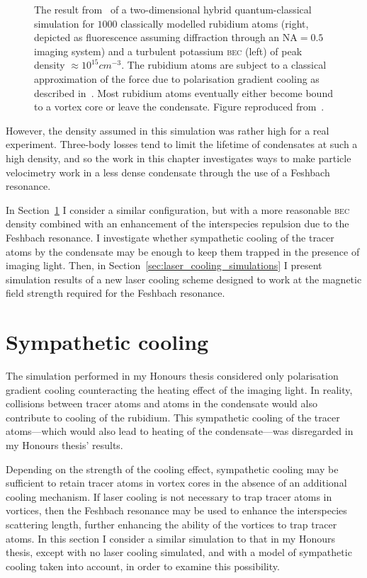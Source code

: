 \begin{figure}
\caption{The result from~\cite{billington_particle_2010} of a two-dimensional hybrid quantum-classical simulation for $1000$ classically modelled rubidium atoms (right, depicted as fluorescence assuming diffraction through an $\mathrm{NA}=0.5$ imaging system) and a turbulent potassium \textsc{bec} (left) of peak density $\approx 10^{15}\unit{cm}^{-3}$. The rubidium atoms are subject to a classical approximation of the force due to polarisation gradient cooling as described in~\cite{billington_particle_2010}. Most rubidium atoms eventually either become bound to a vortex core or leave the condensate. Figure reproduced from~\cite{billington_particle_2010}.}%
\label{fig:hybrid}%
\end{figure}

However, the density assumed in this simulation was rather high for a real experiment. Three-body losses tend to limit the lifetime of condensates at such a high density, and so the work in this chapter investigates ways to make particle velocimetry work in a less dense condensate through the use of a Feshbach resonance.

In Section~\ref{sec:sympathetic} I consider a similar configuration, but with a more reasonable \textsc{bec} density combined with an enhancement of the interspecies repulsion due to the Feshbach resonance. I investigate whether sympathetic cooling of the tracer atoms by the condensate may be enough to keep them trapped in the presence of imaging light. Then, in Section~\ref{sec:laser_cooling_simulations} I present simulation results of a new laser cooling scheme designed to work at the magnetic field strength required for the Feshbach resonance.

\section{Sympathetic cooling}\label{sec:sympathetic}

The simulation performed in my Honours thesis considered only polarisation gradient cooling counteracting the heating effect of the imaging light. In reality, collisions between tracer atoms and atoms in the condensate would also contribute to cooling of the rubidium. This sympathetic cooling of the tracer atoms---which would also lead to heating of the condensate---was disregarded in my Honours thesis' results. 

Depending on the strength of the cooling effect, sympathetic cooling may be sufficient to retain tracer atoms in vortex cores in the absence of an additional cooling mechanism. If laser cooling is not necessary to trap tracer atoms in vortices, then the Feshbach resonance may be used to enhance the interspecies scattering length, further enhancing the ability of the vortices to trap tracer atoms. In this section I consider a similar simulation to that in my Honours thesis, except with no laser cooling simulated, and with a model of sympathetic cooling taken into account, in order to examine this possibility.

